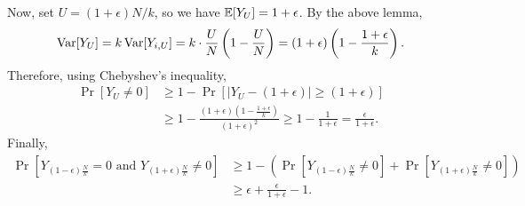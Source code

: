 			Now, set $U = (1+\epsilon)N/k$, so we have $\mathbb{E}[Y_U] = 1+\epsilon$. By the above lemma,
			\[ \operatorname{Var}[Y_U] = k\operatorname{Var}[Y_{i,U}] = k\cdot\frac{U}{N}\left( 1-\frac{U}{N} \right) = (1+\epsilon)\left(1 - \frac{1+\epsilon}{k}\right). \]
			Therefore, using Chebyshev's inequality,
			\begin{align*}
				\Pr[Y_U \ne 0] &\ge 1 - \Pr\left[ |Y_U - (1+\epsilon)| \ge (1+\epsilon) \right] \\
					&\ge 1 - \frac{(1+\epsilon)\left(1-\frac{1+\epsilon}{k}\right)}{(1+\epsilon)^2} \ge 1-\frac{1}{1+\epsilon} = \frac{\epsilon}{1+\epsilon}.
			\end{align*}
			Finally,
			\begin{align*}
				\Pr\left[ Y_{(1-\epsilon)\frac{N}{k}} = 0 \text{ and } Y_{(1+\epsilon)\frac{N}{k}} \ne 0 \right] &\ge 1 - \left( \Pr\left[Y_{(1-\epsilon)\frac{N}{k}} 
				\ne 0 \right] + \Pr\left[ Y_{(1+\epsilon)\frac{N}{k}} \ne 0 \right] \right) \\
					&\ge \epsilon + \frac{\epsilon}{1+\epsilon} - 1.
			\end{align*}

	